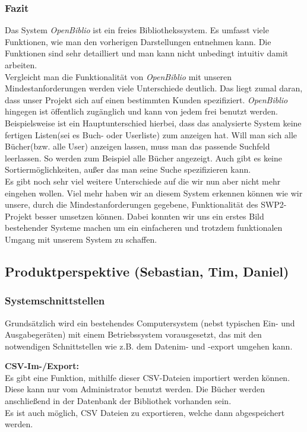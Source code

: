\documentclass[fontsize=12pt,paper=a4,twoside]{scrartcl}
\begin{document}
\subsubsection*{Fazit} \label{subec:Fazit} Das System \emph{OpenBiblio} ist ein freies Bibliothekssystem. Es umfasst viele Funktionen, wie man den vorherigen Darstellungen entnehmen kann. Die Funktionen sind sehr detailliert und man kann nicht unbedingt intuitiv damit arbeiten.\\
Vergleicht man die Funktionalität von \emph{OpenBiblio} mit unseren Mindestanforderungen werden viele Unterschiede deutlich. Das liegt zumal daran, dass unser Projekt sich auf einen bestimmten Kunden spezifiziert. \emph{OpenBiblio} hingegen ist öffentlich zugänglich und kann von jedem frei benutzt werden.\\
Beispielsweise ist ein Hauptunterschied hierbei, dass das analysierte System keine fertigen Listen(sei es Buch- oder Userliste) zum anzeigen hat. Will man sich alle Bücher(bzw. alle User) anzeigen lassen, muss man das passende Suchfeld leerlassen. So werden zum Beispiel alle Bücher angezeigt. Auch gibt es keine Sortiermöglichkeiten, außer das man seine Suche spezifizieren kann.\\
Es gibt noch sehr viel weitere Unterschiede auf die wir nun aber nicht mehr eingehen wollen. Viel mehr haben wir an diesem System erkennen können wie wir unsere, durch die Mindestanforderungen gegebene, Funktionalität des SWP2-Projekt besser umsetzen können. Dabei konnten wir uns ein erstes Bild bestehender Systeme machen um ein einfacheren und trotzdem funktionalen Umgang mit unserem System zu schaffen.

\subsection{Produktperspektive (Sebastian, Tim, Daniel)} \label{subsec:Perspektiven}

\subsubsection{Systemschnittstellen} \label{subsubsec:SystemSchittstellen} Grundsätzlich wird ein bestehendes Computersystem (nebst typischen Ein- und Ausgabegeräten) mit einem Betriebssystem vorausgesetzt, das mit den notwendigen Schnittstellen wie z.B. dem Datenim- und -export umgehen kann.

\textbf{CSV-Im-/Export:}\\
Es gibt eine Funktion, mithilfe dieser CSV-Dateien importiert werden können. Diese kann nur vom Administrator benutzt werden. Die Bücher werden anschließend in der Datenbank der Bibliothek vorhanden sein.\\
Es ist auch möglich, CSV Dateien zu exportieren, welche dann abgespeichert werden.
\end{document}
